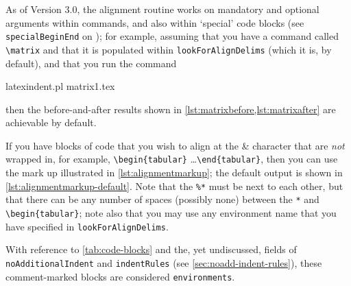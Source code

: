 	As of Version 3.0, the alignment routine works on mandatory and optional arguments within commands, and also within `special' code blocks (see \texttt{specialBeginEnd} on ); for example, assuming that you have a command called \lstinline!\matrix! and that it is populated within \texttt{lookForAlignDelims} (which it is, by default), and that you run the command \begin{commandshell}
latexindent.pl matrix1.tex 
    \end{commandshell} then the before-and-after results shown in \cref{lst:matrixbefore,lst:matrixafter} are achievable by default.

	\begin{minipage}{.45\textwidth}
	\end{minipage}%
	\hfill
	\begin{minipage}{.45\textwidth}
	\end{minipage}%

	If you have blocks of code that you wish to align at the \&  character that are \emph{not} wrapped in, for example, \lstinline!\begin{tabular}! \ldots \lstinline!\end{tabular}!, then you can use the mark up illustrated in \cref{lst:alignmentmarkup}; the default output is shown in \cref{lst:alignmentmarkup-default}.
	Note that the \lstinline!%*! must be next to each other, but that there can be any number of spaces (possibly none) between the \lstinline!*! and \lstinline!\begin{tabular}!; note also that you may use any environment name that you have specified in \texttt{lookForAlignDelims}.

	\begin{minipage}{.45\textwidth}
	\end{minipage}%
	\hfill
	\begin{minipage}{.45\textwidth}
	\end{minipage}%

	With reference to \vref{tab:code-blocks} and the, yet undiscussed, fields of \texttt{noAdditionalIndent} and \texttt{indentRules} (see \vref{sec:noadd-indent-rules}), these comment-marked blocks are considered \texttt{environments}.

